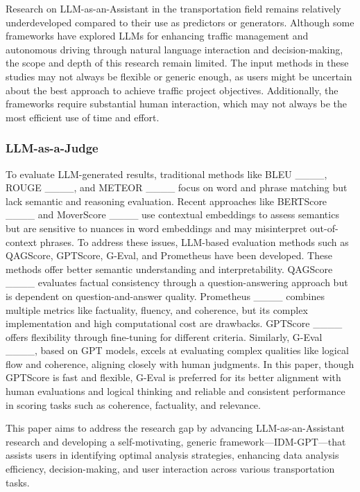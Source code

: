 Research on LLM-as-an-Assistant in the transportation field remains relatively underdeveloped compared to their use as predictors or generators. Although some frameworks have explored LLMs for enhancing traffic management and autonomous driving through natural language interaction and decision-making, the scope and depth of this research remain limited. The input methods in these studies may not always be flexible or generic enough, as users might be uncertain about the best approach to achieve traffic project objectives. Additionally, the frameworks require substantial human interaction, which may not always be the most efficient use of time and effort. 

\subsubsection{LLM-as-a-Judge}
To evaluate LLM-generated results, traditional methods like BLEU ____, ROUGE ____, and METEOR ____ focus on word and phrase matching but lack semantic and reasoning evaluation. Recent approaches like BERTScore ____ and MoverScore ____ use contextual embeddings to assess semantics but are sensitive to nuances in word embeddings and may misinterpret out-of-context phrases. To address these issues, LLM-based evaluation methods such as QAGScore, GPTScore, G-Eval, and Prometheus have been developed. These methods offer better semantic understanding and interpretability. QAGScore ____ evaluates factual consistency through a question-answering approach but is dependent on question-and-answer quality. Prometheus ____ combines multiple metrics like factuality, fluency, and coherence, but its complex implementation and high computational cost are drawbacks. GPTScore ____ offers flexibility through fine-tuning for different criteria. Similarly, G-Eval ____, based on GPT models, excels at evaluating complex qualities like logical flow and coherence, aligning closely with human judgments. In this paper, though GPTScore is fast and flexible, G-Eval is preferred for its better alignment with human evaluations and logical thinking and reliable and consistent performance in scoring tasks such as coherence, factuality, and relevance.

This paper aims to address the research gap by advancing LLM-as-an-Assistant research and developing a self-motivating, generic framework—IDM-GPT—that assists users in identifying optimal analysis strategies, enhancing data analysis efficiency, decision-making, and user interaction across various transportation tasks.